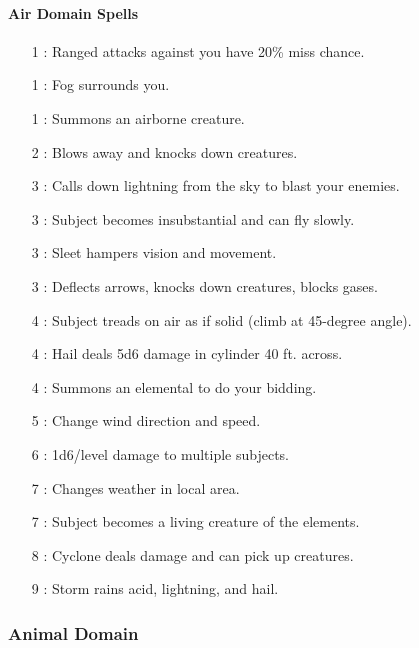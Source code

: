 \paragraph{Air Domain Spells}
\begin{itemize}
\item[1] : Ranged attacks against you have 20\% miss chance.
\item[1] : Fog surrounds you.
\item[1] : Summons an airborne creature.
\item[2] : Blows away and knocks down creatures.
\item[3] : Calls down lightning from the sky to blast your enemies.
\item[3] : Subject becomes insubstantial and can fly slowly.
\item[3] : Sleet hampers vision and movement.
\item[3] : Deflects arrows, knocks down creatures, blocks gases.
\item[4] : Subject treads on air as if solid (climb at 45-degree angle).
\item[4] : Hail deals 5d6 damage in cylinder 40 ft. across.
\item[4] : Summons an elemental to do your bidding.
\item[5] : Change wind direction and speed.
\item[6] : 1d6/level damage to multiple subjects.
\item[7] : Changes weather in local area.
\item[7] : Subject becomes a living creature of the elements.
\item[8] : Cyclone deals damage and can pick up creatures.
\item[9] : Storm rains acid, lightning, and hail.
\end{itemize}
\subsubsection{Animal Domain}
\label{Domain:Animal}
